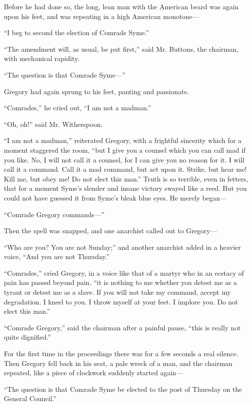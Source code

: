 Before he had done so, the long, lean man with the American beard was again upon his feet, and was repeating in a high American monotone⁠—

“I beg to second the election of Comrade Syme.”

“The amendment will, as usual, be put first,” said Mr. Buttons, the chairman, with mechanical rapidity.

“The question is that Comrade Syme⁠—”

Gregory had again sprung to his feet, panting and passionate.

“Comrades,” he cried out, “I am not a madman.”

“Oh, oh!” said Mr. Witherspoon.

“I am not a madman,” reiterated Gregory, with a frightful sincerity which for a moment staggered the room, “but I give you a counsel which you can call mad if you like. No, I will not call it a counsel, for I can give you no reason for it. I will call it a command. Call it a mad command, but act upon it. Strike, but hear me! Kill me, but obey me! Do not elect this man.” Truth is so terrible, even in fetters, that for a moment Syme’s slender and insane victory swayed like a reed. But you could not have guessed it from Syme’s bleak blue eyes. He merely began⁠—

“Comrade Gregory commands⁠—”

Then the spell was snapped, and one anarchist called out to Gregory⁠—

“Who are you? You are not Sunday;” and another anarchist added in a heavier voice, “And you are not Thursday.”

“Comrades,” cried Gregory, in a voice like that of a martyr who in an ecstacy of pain has passed beyond pain, “it is nothing to me whether you detest me as a tyrant or detest me as a slave. If you will not take my command, accept my degradation. I kneel to you. I throw myself at your feet. I implore you. Do not elect this man.”

“Comrade Gregory,” said the chairman after a painful pause, “this is really not quite dignified.”

For the first time in the proceedings there was for a few seconds a real silence. Then Gregory fell back in his seat, a pale wreck of a man, and the chairman repeated, like a piece of clockwork suddenly started again⁠—

“The question is that Comrade Syme be elected to the post of Thursday on the General Council.”

